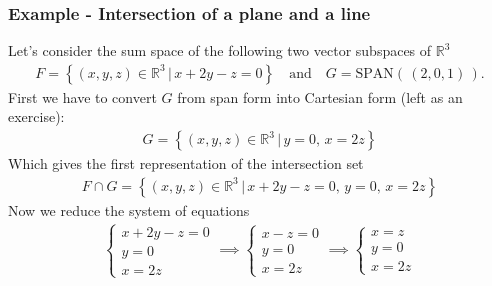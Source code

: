 \documentclass[usenames,dvipsnames,aspectratio=169,10pt]{beamer}
\numberwithin{equation}{section}
\begin{document}
\begin{frame}
\frametitle{Example - Intersection of a plane and a line}
Let's consider the sum space of the following two vector subspaces of $\mathbb{R}^3$
\begin{align*}
F = \left\{ (x,y,z) \in\mathbb{R}^3 \, | \, x+2y-z=0  \right\} \quad\text{and}\quad
G = \text{SPAN}( \, (2,0,1) \, ).
\end{align*}
First we have to convert $G$ from span form into Cartesian form (left as an exercise): \vspace{-0.2cm} 
\begin{align*}
G = \left\{ (x,y,z) \in\mathbb{R}^3 \, | \, y=0, \, x=2z \right\}
\end{align*}
Which gives the first representation of the intersection set \vspace{-0.2cm} 
\begin{align*}
F \cap G = \left\{ (x,y,z) \in\mathbb{R}^3 \, | \, x+2y-z=0, \, y=0, \, x=2z \right\}
\end{align*} 
Now we reduce the system of equations \vspace{-0.2cm} 
\begin{align*}
\begin{cases}
x+2y-z=0 \\ y=0 \\ x=2z 
\end{cases}
\implies
\begin{cases}
x-z=0  \\ y=0 \\ x=2z 
\end{cases}
\implies
\begin{cases}
x=z \\ y=0  \\ x=2z 
\end{cases}
\end{align*}

\end{frame}
\end{document}

